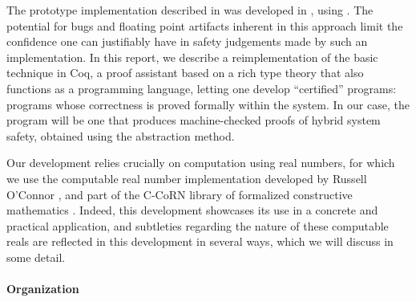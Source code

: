 \documentclass[runningheads]{llncs}
\begin{document}
The prototype implementation described in \cite{alur} was developed in , using . The potential for bugs and floating point artifacts inherent in this approach limit the confidence one can justifiably have in safety judgements made by such an implementation. In this report, we describe a reimplementation of the basic technique in Coq, a proof assistant based on a rich type theory that also functions as a programming language, letting one develop ``certified'' programs: programs whose correctness is proved formally within the system. In our case, the program will be one that produces machine-checked proofs of hybrid system safety, obtained using the abstraction method.

Our development relies crucially on computation using real numbers, for which we use the computable real number implementation developed by Russell O'Connor \cite{something}, and part of the C-CoRN library of formalized constructive mathematics \cite{something}. Indeed, this development showcases its use in a concrete and practical application, and subtleties regarding the nature of these computable reals are reflected in this development in several ways, which we will discuss in some detail.









\paragraph{Organization}
\end{document}

